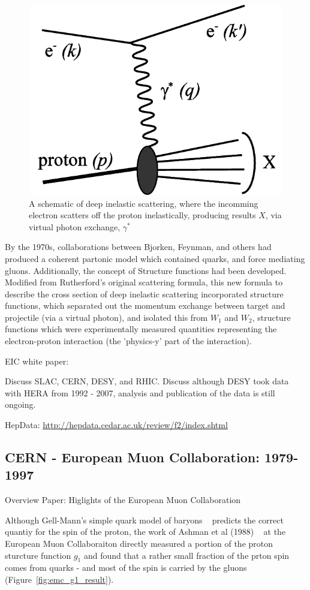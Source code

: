 \begin{figure}
	\centering
	\includegraphics[width=0.6\linewidth]{../Chapter2/fig/deep_inelastic_basic.png}
	\caption{
		A schematic of deep inelastic scattering, where the incomming
		electron scatters off the proton inelastically, producing results $X$, via
		virtual photon exchange, $\gamma^*$
	}
	\label{fig:disschematic}
\end{figure}

By the 1970s, collaborations between Bjorken, Feynman, and others had produced a
coherent partonic model which contained quarks, and force mediating gluons.
Additionally, the concept of Structure functions had been developed. Modified
from Rutherford's original scattering formula, this new formula to describe the
cross section of deep inelastic scattering incorporated structure functions,
which separated out the momentum exchange between target and projectile (via a
virtual photon), and isolated this from $W_1$ and $W_2$, structure functions
which were experimentally measured quantities representing the electron-proton
interaction (the 'physics-y' part of the interaction).

EIC white paper: ~\cite{Accardi2012}

Discuss SLAC, CERN, DESY, and RHIC. Discuss although DESY took data with HERA
from 1992 - 2007, analysis and publication of the data is still ongoing.

HepData: \url{http://hepdata.cedar.ac.uk/review/f2/index.shtml}

\subsection{CERN - European Muon Collaboration: 1979-1997}
Overview Paper: Higlights of the European Muon Collaboration
~\cite{Kullander1990a}

Although Gell-Mann's simple quark model of baryons ~\cite{Gell-Mann1961}
predicts the correct quantiy for the spin of the proton, the work of Ashman et
al (1988) ~\needcite{} at the European Muon Collaboraiton directly measured a
portion of the proton sturcture function $g_1$ and found that a rather small
fraction of the prton spin comes from quarks - and most of the spin is carried
by the gluons (Figure~\ref{fig:emc_g1_result}).

